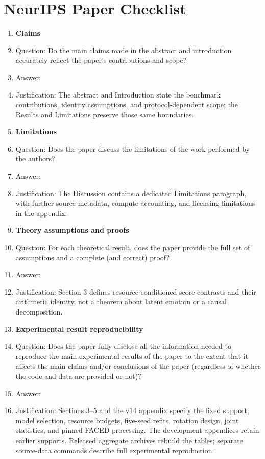 \section*{NeurIPS Paper Checklist}

\begin{enumerate}

\item {\bf Claims}
    \item[] Question: Do the main claims made in the abstract and introduction accurately reflect the paper's contributions and scope?
    \item[] Answer: \answerYes{}
    \item[] Justification: The abstract and Introduction state the benchmark contributions, identity assumptions, and protocol-dependent scope; the Results and Limitations preserve those same boundaries.

\item {\bf Limitations}
    \item[] Question: Does the paper discuss the limitations of the work performed by the authors?
    \item[] Answer: \answerYes{}
    \item[] Justification: The Discussion contains a dedicated Limitations paragraph, with further source-metadata, compute-accounting, and licensing limitations in the appendix.

\item {\bf Theory assumptions and proofs}
    \item[] Question: For each theoretical result, does the paper provide the full set of assumptions and a complete (and correct) proof?
    \item[] Answer: \answerNA{}
    \item[] Justification: Section 3 defines resource-conditioned score contrasts and their arithmetic identity, not a theorem about latent emotion or a causal decomposition.

    \item {\bf Experimental result reproducibility}
    \item[] Question: Does the paper fully disclose all the information needed to reproduce the main experimental results of the paper to the extent that it affects the main claims and/or conclusions of the paper (regardless of whether the code and data are provided or not)?
    \item[] Answer: \answerYes{}
    \item[] Justification: Sections 3--5 and the v14 appendix specify the fixed support, model selection, resource budgets, five-seed refits, rotation design, joint statistics, and pinned FACED processing. The development appendices retain earlier supports. Released aggregate archives rebuild the tables; separate source-data commands describe full experimental reproduction.



\end{enumerate}
